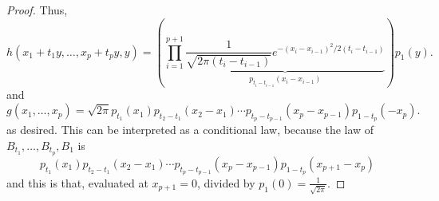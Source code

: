 \documentclass{scrartcl}
\DeclareMathOperator{\cov}{cov}
\begin{document}
\begin{proof}
    Thus,
    \[
        h(x_1 + t_1 y,\dots, x_p + t_p y, y) = \left(\prod_{i=1}^{p+1} \underbrace{\frac{1}{\sqrt{2\pi (t_i - t_{i-1})}}e^{-(x_i - x_{i-1})^2/2(t_i - t_{i-1})}}_{p_{t_i - t_{i-1}}(x_i - x_{i-1})}\right) p_1(y).
    \]
    and
    \[
        g(x_1,\dots, x_p) = \sqrt{2\pi} p_{t_1}(x_1)p_{t_2 - t_1}(x_2 - x_1)\cdots p_{t_p - t_{p-1}}(x_p - x_{p-1})p_{1 - t_p}(-x_p).
    \]
    as desired. This can be interpreted as a conditional law, because the law of $B_{t_1},\dots, B_{t_p}, B_1$ is
    \[
        p_{t_1}(x_1)p_{t_2 - t_1}(x_2 - x_1)\cdots p_{t_p - t_{p-1}}(x_p - x_{p-1})p_{1 - t_p}(x_{p+1}-x_p)
    \]
    and this is that, evaluated at $x_{p+1} = 0$, divided by $p_1(0) = \frac{1}{\sqrt{2\pi}}$.
\end{proof}

\end{document}
